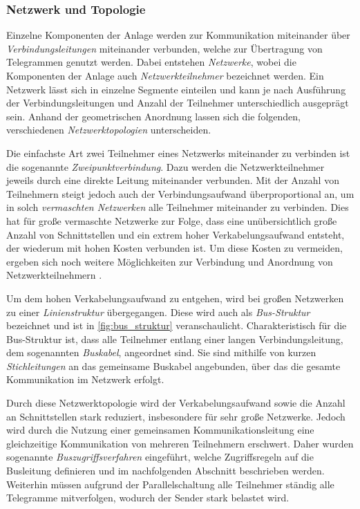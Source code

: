\subsubsection{Netzwerk und Topologie}

Einzelne Komponenten der Anlage werden zur Kommunikation miteinander über \textit{Verbindungsleitungen} miteinander verbunden, welche zur Übertragung von Telegrammen genutzt werden. Dabei entstehen \textit{Netzwerke}, wobei die Komponenten der Anlage auch \textit{Netzwerkteilnehmer} bezeichnet werden. Ein Netzwerk lässt sich in einzelne Segmente einteilen und kann je nach Ausführung der Verbindungsleitungen und Anzahl der Teilnehmer unterschiedlich ausgeprägt sein. Anhand der geometrischen Anordnung lassen sich die folgenden, verschiedenen \textit{Netzwerktopologien} unterscheiden.


Die einfachste Art zwei Teilnehmer eines Netzwerks miteinander zu verbinden ist die sogenannte \textit{Zweipunktverbindung}. Dazu werden die Netzwerkteilnehmer jeweils durch eine direkte Leitung miteinander verbunden. Mit der Anzahl von Teilnehmern steigt jedoch auch der Verbindungsaufwand überproportional an, um in solch \textit{vermaschten Netzwerken} alle Teilnehmer miteinander zu verbinden. Dies hat für große vermaschte Netzwerke zur Folge, dass eine unübersichtlich große Anzahl von Schnittstellen und ein extrem hoher Verkabelungsaufwand entsteht, der wiederum mit hohen Kosten verbunden ist. Um diese Kosten zu vermeiden, ergeben sich noch weitere Möglichkeiten zur Verbindung und Anordnung von Netzwerkteilnehmern \cite[S.~1f.]{schn06}.


Um dem hohen Verkabelungsaufwand zu entgehen, wird bei großen Netzwerken zu einer \textit{Linienstruktur} übergegangen. Diese wird auch als \textit{Bus-Struktur} bezeichnet und ist in \ref{fig:bus_struktur} veranschaulicht. Charakteristisch für die Bus-Struktur ist, dass alle Teilnehmer entlang einer langen Verbindungsleitung, dem sogenannten \textit{Buskabel}, angeordnet sind. Sie sind mithilfe von kurzen \textit{Stichleitungen} an das gemeinsame Buskabel angebunden, über das die gesamte Kommunikation im Netzwerk erfolgt.

Durch diese Netzwerktopologie wird der Verkabelungsaufwand sowie die Anzahl an Schnittstellen stark reduziert, insbesondere für sehr große Netzwerke. Jedoch wird durch die Nutzung einer gemeinsamen Kommunikationsleitung eine gleichzeitige Kommunikation von mehreren Teilnehmern erschwert. Daher wurden sogenannte \textit{Buszugriffsverfahren} eingeführt, welche Zugriffsregeln auf die Busleitung definieren und im nachfolgenden Abschnitt beschrieben werden. Weiterhin müssen aufgrund der Parallelschaltung alle Teilnehmer ständig alle Telegramme mitverfolgen, wodurch der Sender stark belastet wird. 

